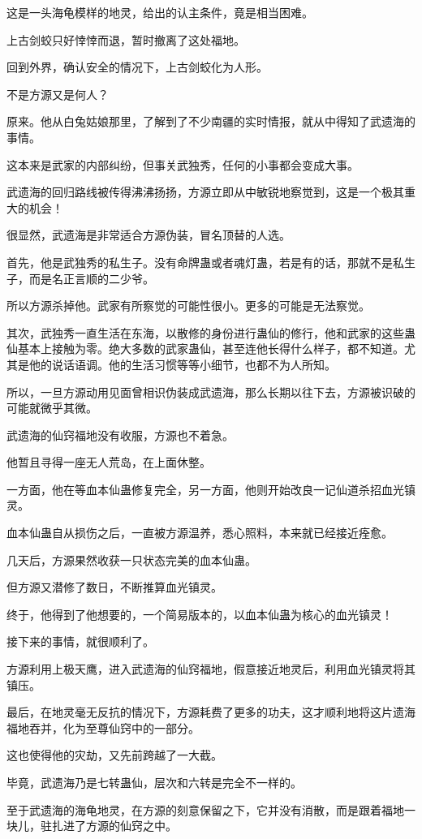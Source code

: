 \begin{this_body}
这是一头海龟模样的地灵，给出的认主条件，竟是相当困难。

上古剑蛟只好悻悻而退，暂时撤离了这处福地。

回到外界，确认安全的情况下，上古剑蛟化为人形。

不是方源又是何人？

原来。他从白兔姑娘那里，了解到了不少南疆的实时情报，就从中得知了武遗海的事情。

这本来是武家的内部纠纷，但事关武独秀，任何的小事都会变成大事。

武遗海的回归路线被传得沸沸扬扬，方源立即从中敏锐地察觉到，这是一个极其重大的机会！

很显然，武遗海是非常适合方源伪装，冒名顶替的人选。

首先，他是武独秀的私生子。没有命牌蛊或者魂灯蛊，若是有的话，那就不是私生子，而是名正言顺的二少爷。

所以方源杀掉他。武家有所察觉的可能性很小。更多的可能是无法察觉。

其次，武独秀一直生活在东海，以散修的身份进行蛊仙的修行，他和武家的这些蛊仙基本上接触为零。绝大多数的武家蛊仙，甚至连他长得什么样子，都不知道。尤其是他的说话语调。他的生活习惯等等小细节，也都不为人所知。

所以，一旦方源动用见面曾相识伪装成武遗海，那么长期以往下去，方源被识破的可能就微乎其微。

武遗海的仙窍福地没有收服，方源也不着急。

他暂且寻得一座无人荒岛，在上面休整。

一方面，他在等血本仙蛊修复完全，另一方面，他则开始改良一记仙道杀招血光镇灵。

血本仙蛊自从损伤之后，一直被方源温养，悉心照料，本来就已经接近痊愈。

几天后，方源果然收获一只状态完美的血本仙蛊。

但方源又潜修了数日，不断推算血光镇灵。

终于，他得到了他想要的，一个简易版本的，以血本仙蛊为核心的血光镇灵！

接下来的事情，就很顺利了。

方源利用上极天鹰，进入武遗海的仙窍福地，假意接近地灵后，利用血光镇灵将其镇压。

最后，在地灵毫无反抗的情况下，方源耗费了更多的功夫，这才顺利地将这片遗海福地吞并，化为至尊仙窍中的一部分。

这也使得他的灾劫，又先前跨越了一大截。

毕竟，武遗海乃是七转蛊仙，层次和六转是完全不一样的。

至于武遗海的海龟地灵，在方源的刻意保留之下，它并没有消散，而是跟着福地一块儿，驻扎进了方源的仙窍之中。


\end{this_body}
